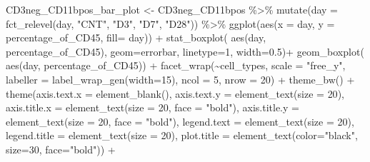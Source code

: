 \documentclass[
]{book}
\newenvironment{Shaded}{\begin{snugshade}}{\end{snugshade}}
\newcommand{\AttributeTok}[1]{\textcolor[rgb]{0.77,0.63,0.00}{#1}}
\newcommand{\DecValTok}[1]{\textcolor[rgb]{0.00,0.00,0.81}{#1}}
\newcommand{\FloatTok}[1]{\textcolor[rgb]{0.00,0.00,0.81}{#1}}
\newcommand{\FunctionTok}[1]{\textcolor[rgb]{0.00,0.00,0.00}{#1}}
\newcommand{\NormalTok}[1]{#1}
\newcommand{\OtherTok}[1]{\textcolor[rgb]{0.56,0.35,0.01}{#1}}
\newcommand{\SpecialCharTok}[1]{\textcolor[rgb]{0.00,0.00,0.00}{#1}}
\newcommand{\StringTok}[1]{\textcolor[rgb]{0.31,0.60,0.02}{#1}}
\begin{document}
\begin{Shaded}
\begin{Highlighting}[]
\NormalTok{CD3neg\_CD11bpos\_bar\_plot }\OtherTok{\textless{}{-}}\NormalTok{ CD3neg\_CD11bpos }\SpecialCharTok{\%\textgreater{}\%}
\FunctionTok{mutate}\NormalTok{(}\AttributeTok{day =} \FunctionTok{fct\_relevel}\NormalTok{(day, }
            \StringTok{"CNT"}\NormalTok{, }\StringTok{"D3"}\NormalTok{, }\StringTok{"D7"}\NormalTok{, }
            \StringTok{"D28"}\NormalTok{)) }\SpecialCharTok{\%\textgreater{}\%}
  \FunctionTok{ggplot}\NormalTok{(}\FunctionTok{aes}\NormalTok{(}\AttributeTok{x =}\NormalTok{ day, }\AttributeTok{y =}\NormalTok{ percentage\_of\_CD45, }\AttributeTok{fill=}\NormalTok{ day)) }\SpecialCharTok{+}
  \FunctionTok{stat\_boxplot}\NormalTok{( }\FunctionTok{aes}\NormalTok{(day, percentage\_of\_CD45), }
    \AttributeTok{geom=}\StringTok{\textquotesingle{}errorbar\textquotesingle{}}\NormalTok{, }\AttributeTok{linetype=}\DecValTok{1}\NormalTok{, }\AttributeTok{width=}\FloatTok{0.5}\NormalTok{)}\SpecialCharTok{+}  
  \FunctionTok{geom\_boxplot}\NormalTok{( }\FunctionTok{aes}\NormalTok{(day, percentage\_of\_CD45)) }\SpecialCharTok{+} 
  \FunctionTok{facet\_wrap}\NormalTok{(}\SpecialCharTok{\textasciitilde{}}\NormalTok{cell\_types, }\AttributeTok{scale =} \StringTok{"free\_y"}\NormalTok{, }\AttributeTok{labeller =} \FunctionTok{label\_wrap\_gen}\NormalTok{(}\AttributeTok{width=}\DecValTok{15}\NormalTok{), }\AttributeTok{ncol =} \DecValTok{5}\NormalTok{, }\AttributeTok{nrow =} \DecValTok{20}\NormalTok{) }\SpecialCharTok{+} 
  \FunctionTok{theme\_bw}\NormalTok{() }\SpecialCharTok{+} 
  \FunctionTok{theme}\NormalTok{(}\AttributeTok{axis.text.x =} \FunctionTok{element\_blank}\NormalTok{(), }\AttributeTok{axis.text.y =} \FunctionTok{element\_text}\NormalTok{(}\AttributeTok{size =} \DecValTok{20}\NormalTok{), }
        \AttributeTok{axis.title.x =} \FunctionTok{element\_text}\NormalTok{(}\AttributeTok{size =} \DecValTok{20}\NormalTok{, }\AttributeTok{face =} \StringTok{"bold"}\NormalTok{), }
        \AttributeTok{axis.title.y =} \FunctionTok{element\_text}\NormalTok{(}\AttributeTok{size =} \DecValTok{20}\NormalTok{, }\AttributeTok{face =} \StringTok{"bold"}\NormalTok{), }
        \AttributeTok{legend.text =} \FunctionTok{element\_text}\NormalTok{(}\AttributeTok{size =} \DecValTok{20}\NormalTok{), }
        \AttributeTok{legend.title =} \FunctionTok{element\_text}\NormalTok{(}\AttributeTok{size =} \DecValTok{20}\NormalTok{), }
        \AttributeTok{plot.title =} \FunctionTok{element\_text}\NormalTok{(}\AttributeTok{color=}\StringTok{"black"}\NormalTok{, }\AttributeTok{size=}\DecValTok{30}\NormalTok{, }\AttributeTok{face=}\StringTok{"bold"}\NormalTok{)) }\SpecialCharTok{+} 

\end{Highlighting}
\end{Shaded}
\end{document}
